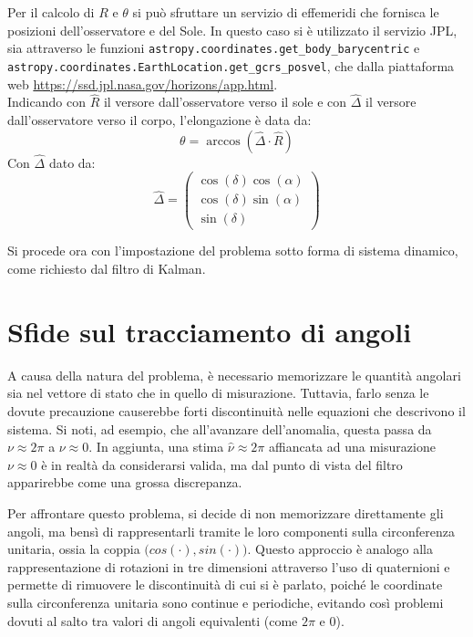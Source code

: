 \documentclass[12pt,a4paper,openright,twoside]{book}
\begin{document}
Per il calcolo di $R$ e $\theta$ si può sfruttare un servizio di effemeridi che fornisca le posizioni dell'osservatore e del Sole. In questo caso si è utilizzato il servizio JPL, sia attraverso le funzioni \lstinline{astropy.coordinates.get_body_barycentric} e \lstinline{astropy.coordinates.EarthLocation.get_gcrs_posvel}, che dalla piattaforma web \url{https://ssd.jpl.nasa.gov/horizons/app.html}. \\
Indicando con $\hat{R}$ il versore dall'osservatore verso il sole e con $\hat{\Delta}$ il versore dall'osservatore verso il corpo, l'elongazione è data da:
\begin{equation}
\theta=\arccos\left(\hat{\Delta}\cdot\hat{R}\right)
\end{equation}
Con $\hat{\Delta}$ dato da:
\begin{equation}\label{eq:radec2dir}
\hat{\Delta}=\begin{pmatrix}
\cos(\delta)\cos(\alpha) \\
\cos(\delta)\sin(\alpha) \\
\sin(\delta)
\end{pmatrix}
\end{equation}


Si procede ora con l'impostazione del problema sotto forma di sistema dinamico, come richiesto dal filtro di Kalman.

\section{Sfide sul tracciamento di angoli}\label{sec:angle-challenges}

A causa della natura del problema, è necessario memorizzare le quantità angolari sia nel vettore di stato che in quello di misurazione. Tuttavia, farlo senza le dovute precauzione causerebbe forti discontinuità nelle equazioni che descrivono il sistema. Si noti, ad esempio, che all'avanzare dell'anomalia, questa passa da $\nu\approx2\pi$ a $\nu\approx0$. In aggiunta, una stima $\hat{\nu}\approx2\pi$ affiancata ad una misurazione $\nu\approx0$ è in realtà da considerarsi valida, ma dal punto di vista del filtro apparirebbe come una grossa discrepanza.

Per affrontare questo problema, si decide di non memorizzare direttamente gli angoli, ma bensì di rappresentarli tramite le loro componenti sulla circonferenza unitaria, ossia la coppia $\bigl(cos(\cdot),sin(\cdot)\bigr)$. Questo approccio è analogo alla rappresentazione di rotazioni in tre dimensioni attraverso l'uso di quaternioni e permette di rimuovere le discontinuità di cui si è parlato, poiché le coordinate sulla circonferenza unitaria sono continue e periodiche, evitando così problemi dovuti al salto tra valori di angoli equivalenti (come $2\pi$ e $0$).
\end{document}
